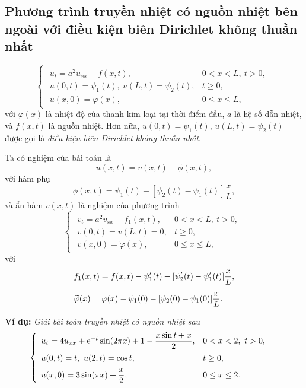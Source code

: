 \documentclass[10pt, a4paper]{article}
\begin{document}
	\subsection{Phương trình truyền nhiệt có nguồn nhiệt bên ngoài với điều kiện biên Dirichlet không thuần nhất}
	\vspace{2mm}
	\begin{tcolorbox}[enhanced,colback=blue!5!white,colframe=blue!75!black,sharp corners=all,shadow={0mm}{0mm}{-1.5mm}%
		{fill=blue!75!red,opacity=0.3},title=\textbf{Dạng của bài toán}]
		$$\begin{cases}
			\begin{array}{ll}
				u_t=a^2u_{xx}+f(x,t), & 0<x<L,~t>0,\\
				u(0,t)=\psi_1(t),~u(L,t)=\psi_2(t), & t\ge0,\\
				u(x,0)=\varphi(x), & 0\le x\le L,
			\end{array}
		\end{cases}$$
		với $\varphi(x)$ là nhiệt độ của thanh kim loại tại thời điểm đầu, $a$ là hệ số dẫn nhiệt, và $f(x,t)$ là nguồn nhiệt.\vskip7pt
		Hơn nữa, $u(0,t)=\psi_1(t),\,u(L,t)=\psi_2(t)$ được gọi là \textit{điều kiện biên Dirichlet không thuần nhất}.
	\end{tcolorbox}
	\vspace{2mm}
	Ta có nghiệm của bài toán là $$u(x,t)=v(x,t)+\phi(x,t),$$ với hàm phụ $$\phi(x,t)=\psi_1(t)+[\psi_2(t)-\psi_1(t)]\dfrac xL,$$
	và ẩn hàm $v(x,t)$ là nghiệm của phương trình $$\begin{cases}
		\begin{array}{ll}
			v_t=a^2v_{xx}+f_1(x,t), & 0<x<L,~t>0,\\
			v(0,t)=v(L,t)=0, & t\ge0,\\
			v(x,0)=\widetilde\varphi(x), & 0\le x\le L,
		\end{array}
	\end{cases}$$ với \begin{align*}
		&f_1(x,t)=f(x,t)-\psi_1'(t)-[\psi_2'(t)-\psi_1'(t)]\dfrac xL,\\
		\noalign{\vskip5pt}
		&\widetilde\varphi(x)=\varphi(x)-\psi_1(0)-[\psi_2(0)-\psi_1(0)]\dfrac xL.
	\end{align*}
	
	\textbf{Ví dụ:} \textit{Giải bài toán truyền nhiệt có nguồn nhiệt sau} $$\begin{cases}
		\begin{array}{ll}
			u_t=4u_{xx}+\mathrm e^{-t}\sin(2\pi x)+1-\dfrac{x\sin t+x}{2}, & 0<x<2,~t>0,\\
			\noalign{\vskip4pt}
			u(0,t)=t,~u(2,t)=\cos t, & t\ge0,\\
			\noalign{\vskip5pt}
			u(x,0)=3\sin(\pi x)+\dfrac x2, & 0\le x\le 2.
		\end{array}
	\end{cases}$$
	
\end{document}
